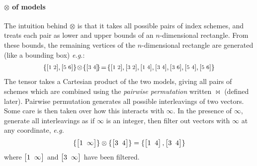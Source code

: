 \documentclass[10pt,preprint,numbers]{sigplanconf}
\theoremstyle{definition}
\newcommand{\eg}{\emph{e.g.}}
\newcommand{\vtwohs}[2]{\setlength{\arraycolsep}{0em}
\left[\begin{array}{cc}#1 \, & \, #2\end{array}\right]\!}
\newcommand{\vtwoh}[2]{\setlength{\arraycolsep}{0em}
\left[\begin{array}{cc}#1 \; & \; #2\end{array}\right]}
\begin{document}
\paragraph{$\otimes$ of models}

The intuition behind $\otimes$ is that it takes all possible pairs of
index schemes, and treats each pair as lower and upper bounds of an
$n$-dimensional rectangle. From these bounds,
the remaining vertices of the $n$-dimensional rectangle are
generated (like a bounding box) \eg{}:
\begin{align*}
{\small{
\{\vtwohs{1}{2},\vtwohs{5}{6}\,\}\!\otimes\!\{\vtwohs{3}{4}\}\!=\!\{\vtwohs{1}{2},\vtwohs{3}{2},\vtwohs{1}{4},\vtwohs{3}{4},
   \vtwohs{3}{6},\vtwohs{5}{4},\vtwohs{5}{6}\,\}
}}
\end{align*}
The tensor takes a Cartesian product of the two models,
giving all pairs of schemes which are combined using the
\emph{pairwise permutation} written $\bowtie$ (defined later).
Pairwise permutation generates all possible interleavings of two
vectors. Some care is then taken over how this interacts with $\infty$.
In the presence of $\infty$, generate all interleavings as if $\infty$ is
an integer, then filter out vectors with $\infty$ at any coordinate, \eg{}
\begin{align*}
\{\vtwoh{1}{\infty}\} \otimes \{\vtwoh{3}{4}\} =
\{\vtwoh{1}{4}, \vtwoh{3}{4}\}
\end{align*}
%
where $\vtwoh{1}{\infty}$ and $\vtwoh{3}{\infty}$ have been filtered.
\end{document}
